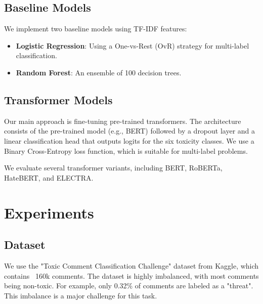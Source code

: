 \documentclass[11pt]{article}
\begin{document}
\subsection{Baseline Models}
We implement two baseline models using TF-IDF features:
\begin{itemize}
    \item \textbf{Logistic Regression}: Using a One-vs-Rest (OvR) strategy for multi-label classification.
    \item \textbf{Random Forest}: An ensemble of 100 decision trees.
\end{itemize}

\subsection{Transformer Models}
Our main approach is fine-tuning pre-trained transformers. The architecture consists of the pre-trained model (e.g., BERT) followed by a dropout layer and a linear classification head that outputs logits for the six toxicity classes. We use a Binary Cross-Entropy loss function, which is suitable for multi-label problems.

We evaluate several transformer variants, including BERT, RoBERTa, HateBERT, and ELECTRA.

\section{Experiments}

\subsection{Dataset}
We use the "Toxic Comment Classification Challenge" dataset from Kaggle, which contains ~160k comments. The dataset is highly imbalanced, with most comments being non-toxic. For example, only 0.32\% of comments are labeled as a "threat". This imbalance is a major challenge for this task.
\end{document}
